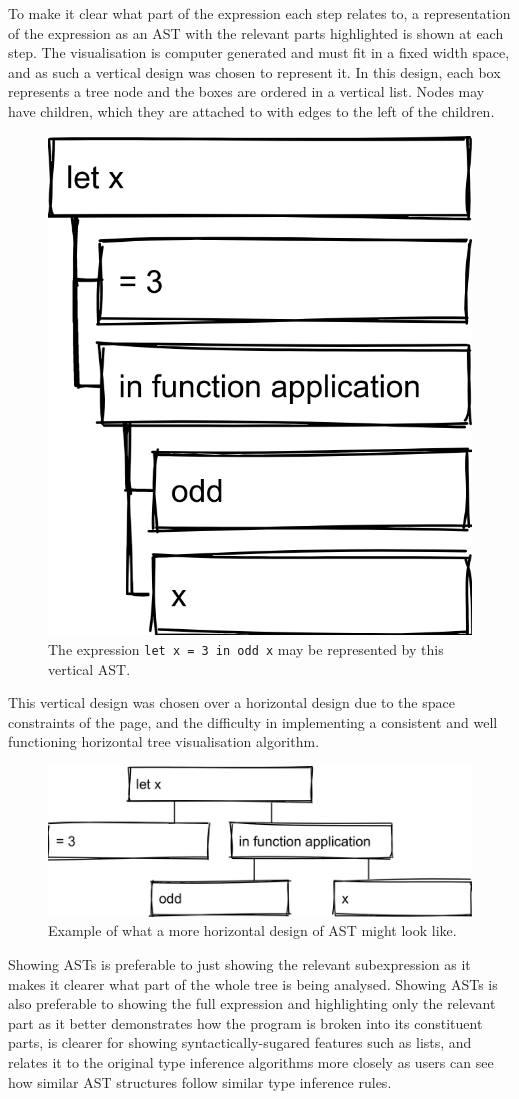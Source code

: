 \documentclass[a4paper,fleqn,oneside,12pt]{report}
\begin{document}
To make it clear what part of the expression each step relates to, a representation of the expression as an AST with the relevant parts highlighted is shown at each step. The visualisation is computer generated and must fit in a fixed width space, and as such a vertical design was chosen to represent it. In this design, each box represents a tree node and the boxes are ordered in a vertical list. Nodes may have children, which they are attached to with edges to the left of the children.

{\centering \begin{figure}[h!]
  \centering
  \includegraphics[width=0.357\linewidth]{images/image31.png}
  \caption{The expression \texttt{let x = 3 in odd x} may be represented by this vertical AST.}
\end{figure} \par}

This vertical design was chosen over a horizontal design due to the space constraints of the page, and the difficulty in implementing a consistent and well functioning horizontal tree visualisation algorithm.

{\centering \begin{figure}[h!]
  \centering
  \includegraphics[width=0.813\linewidth]{images/image13.png}
  \caption{Example of what a more horizontal design of AST might look like.}
\end{figure} \par}

Showing ASTs is preferable to just showing the relevant subexpression as it makes it clearer what part of the whole tree is being analysed. Showing ASTs is also preferable to showing the full expression and highlighting only the relevant part as it better demonstrates how the program is broken into its constituent parts, is clearer for showing syntactically-sugared features such as lists, and relates it to the original type inference algorithms more closely as users can see how similar AST structures follow similar type inference rules.
\end{document}
